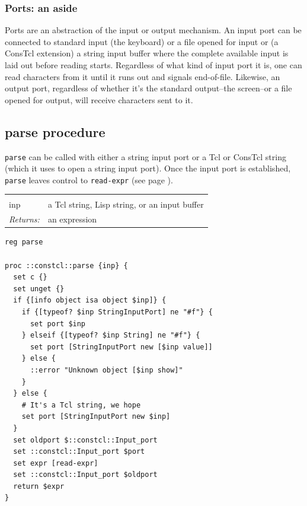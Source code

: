 \documentclass[twoside,9pt]{report}
\begin{document}
\subsubsection{Ports: an aside}
\label{ports-an-aside}


Ports are an abstraction of the input or output mechanism. An input port can be connected to standard input (the keyboard) or a file opened for input or (a ConsTcl extension) a string input buffer where the complete available input is laid out before reading starts. Regardless of what kind of input port it is, one can read characters from it until it runs out and signals end-of-file. Likewise, an output port, regardless of whether it's the standard output--the screen--or a file opened for output, will receive characters sent to it.

\subsection{parse procedure}
\label{parse-procedure}


\texttt{parse} can be called with either a string input port or a Tcl or ConsTcl string (which it uses to open a string input port). Once the input port is established, \texttt{parse} leaves control to \texttt{read-expr} (see page \pageref{read-expr-procedure}).

\noindent\begin{tabular}{ |p{1.5cm} p{8cm}| }
\hline
\rowcolor[HTML]{CCCCCC} \multicolumn{2}{|l|}{\bf parse (internal)} \\
inp & a Tcl string, Lisp string, or an input buffer \\
\textit{Returns:} & an expression \\
\hline
\end{tabular}
\begin{lstlisting}
reg parse
 
proc ::constcl::parse {inp} {
  set c {}
  set unget {}
  if {[info object isa object $inp]} {
    if {[typeof? $inp StringInputPort] ne "#f"} {
      set port $inp
    } elseif {[typeof? $inp String] ne "#f"} {
      set port [StringInputPort new [$inp value]]
    } else {
      ::error "Unknown object [$inp show]"
    }
  } else {
    # It's a Tcl string, we hope
    set port [StringInputPort new $inp]
  }
  set oldport $::constcl::Input_port
  set ::constcl::Input_port $port
  set expr [read-expr]
  set ::constcl::Input_port $oldport
  return $expr
}
\end{lstlisting}
\end{document}
